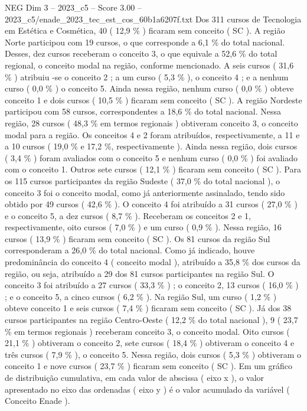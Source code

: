 \begin{textsample}{NEG Dim 3 – 2023\_c5 – Score 3.00 – 2023\_c5/enade\_2023\_tec\_est\_cos\_60b1a6207f.txt}
Dos 311 cursos de Tecnologia em Estética e Cosmética, 40 ( 12,9 \% ) ficaram sem conceito ( SC ).
A região Norte participou com 19 cursos, o que corresponde a 6,1 \% do total nacional.
Desses, dez cursos receberam o conceito 3, o que equivale a 52,6 \% do total regional, o conceito modal na região, conforme mencionado.
A seis cursos ( 31,6 \% ) atribuiu -se o conceito 2 ; a um curso ( 5,3 \% ), o conceito 4 ; e a nenhum curso ( 0,0 \% ) o conceito 5.
Ainda nessa região, nenhum curso ( 0,0 \% ) obteve conceito 1 e dois cursos ( 10,5 \% ) ficaram sem conceito ( SC ).
A região Nordeste participou com 58 cursos, correspondentes a 18,6 \% do total nacional.
Nessa região, 28 cursos ( 48,3 \% em termos regionais ) obtiveram conceito 3, o conceito modal para a região.
Os conceitos 4 e 2 foram atribuídos, respectivamente, a 11 e a 10 cursos ( 19,0 \% e 17,2 \%, respectivamente ).
Ainda nessa região, dois cursos ( 3,4 \% ) foram avaliados com o conceito 5 e nenhum curso ( 0,0 \% ) foi avaliado com o conceito 1.
Outros sete cursos ( 12,1 \% ) ficaram sem conceito ( SC ).
Para os 115 cursos participantes da região Sudeste ( 37,0 \% do total nacional ), o conceito 3 foi o conceito modal, como já anteriormente assinalado, tendo sido obtido por 49 cursos ( 42,6 \% ).
O conceito 4 foi atribuído a 31 cursos ( 27,0 \% ) e o conceito 5, a dez cursos ( 8,7 \% ).
Receberam os conceitos 2 e 1, respectivamente, oito cursos ( 7,0 \% ) e um curso ( 0,9 \% ).
Nessa região, 16 cursos ( 13,9 \% ) ficaram sem conceito ( SC ).
Os 81 cursos da região Sul corresponderam a 26,0 \% do total nacional.
Como já indicado, houve predominância do conceito 4 ( conceito modal ), atribuído a 35,8 \% dos cursos da região, ou seja, atribuído a 29 dos 81 cursos participantes na região Sul.
O conceito 3 foi atribuído a 27 cursos ( 33,3 \% ) ; o conceito 2, 13 cursos ( 16,0 \% ) ; e o conceito 5, a cinco cursos ( 6,2 \% ).
Na região Sul, um curso ( 1,2 \% ) obteve conceito 1 e seis cursos ( 7,4 \% ) ficaram sem conceito ( SC ).
Já dos 38 cursos participantes na região Centro-Oeste ( 12,2 \% do total nacional ), 9 ( 23,7 \% em termos regionais ) receberam conceito 3, o conceito modal.
Oito cursos ( 21,1 \% ) obtiveram o conceito 2, sete cursos ( 18,4 \% ) obtiveram o conceito 4 e três cursos ( 7,9 \% ), o conceito 5.
Nessa região, dois cursos ( 5,3 \% ) obtiveram o conceito 1 e nove cursos ( 23,7 \% ) ficaram sem conceito ( SC ).
Em um gráfico de distribuição cumulativa, em cada valor de abscissa ( eixo x ), o valor apresentado no eixo das ordenadas ( eixo y ) é o valor acumulado da variável ( Conceito Enade ).

\end{textsample}
